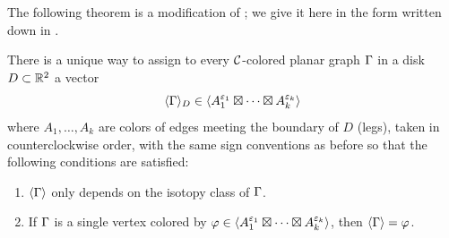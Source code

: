 The following theorem is a modification of ; we
give it here in the form written down in .
\begin{theorem}\label{t:evaluation-disk}
  There is a unique way to assign to every $\mathcal{C}$-colored
  planar graph $\Gamma$ in a disk $D\subset \mathbb{R}^2$ a vector
  \begin{equation}
    \langle\Gamma\rangle_D\in\langle A_1^{\varepsilon_1}\boxtimes\dots\boxtimes A_k^{\varepsilon_k}\rangle
  \end{equation}
  where $A_1, \dots, A_k$ are colors of edges meeting the boundary
  of $D$ \textup{(}legs\textup{)}, taken in counterclockwise order, with the same sign
  conventions as before
  so that the following conditions are satisfied:
  \begin{enumerate}
     \item $\langle\Gamma\rangle$ only depends on the isotopy class of $\Gamma$.

    \item If $\Gamma$ is a single vertex colored by
          $\varphi\in \langle A_1^{\varepsilon_1}\boxtimes\dots\boxtimes A_k^{\varepsilon_k}\rangle$, then
          $\langle\Gamma\rangle=\varphi$.


\end{enumerate}
\end{theorem}
